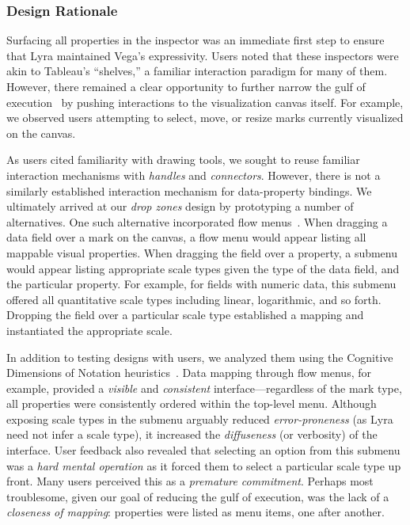 \subsubsection{Design Rationale}

Surfacing all properties in the inspector was an immediate first step to ensure
that Lyra maintained Vega's expressivity. Users noted that these inspectors were
akin to Tableau's ``shelves,'' a familiar interaction paradigm for many of them.
However, there remained a clear opportunity to further narrow the gulf of
execution~\cite{hutchins:directmanip} by pushing interactions to the
visualization canvas itself. For example, we observed users attempting to
select, move, or resize marks currently visualized on the canvas.

As users cited familiarity with drawing tools, we sought to reuse familiar
interaction mechanisms with \emph{handles} and \emph{connectors}. However, there
is not a similarly established interaction mechanism for data-property bindings.
We ultimately arrived at our \emph{drop zones} design by prototyping a number of
alternatives. One such alternative incorporated flow
menus~\cite{guimbretiere:flowmenu}. When dragging a data field over a mark on
the canvas, a flow menu would appear listing all mappable visual properties.
When dragging the field over a property, a submenu would appear listing
appropriate scale types given the type of the data field, and the particular
property. For example, for fields with numeric data, this submenu offered all
quantitative scale types including linear, logarithmic, and so forth. Dropping
the field over a particular scale type established a mapping and instantiated
the appropriate scale.

In addition to testing designs with users, we analyzed them using the Cognitive
Dimensions of Notation heuristics~\cite{blackwell:cogdim}. Data mapping through
flow menus, for example, provided a \emph{visible} and \emph{consistent}
interface---regardless of the mark type, all properties were consistently
ordered within the top-level menu. Although exposing scale types in the submenu
arguably reduced \emph{error\--proneness} (as Lyra need not infer a scale type),
it increased the \emph{diffuseness} (or verbosity) of the interface. User
feedback also revealed that selecting an option from this submenu was a
\emph{hard mental operation} as it forced them to select a particular scale type
up front. Many users perceived this as a \emph{premature commitment}. Perhaps
most troublesome, given our goal of reducing the gulf of execution, was the lack
of a \emph{closeness of mapping}: properties were listed as menu items, one
after another.


